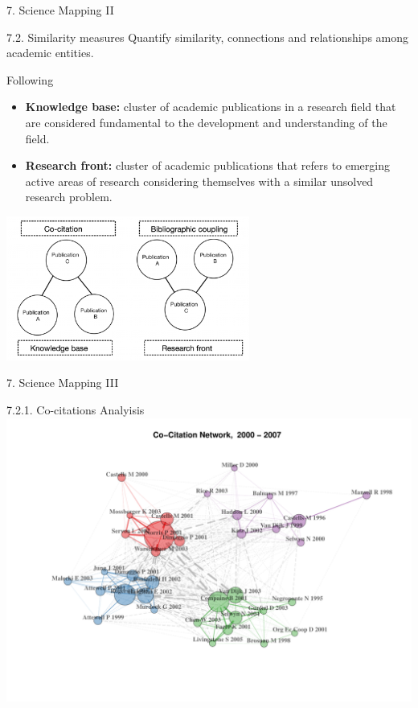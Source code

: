 \documentclass[
  ignorenonframetext,
]{beamer}
\begin{document}
\begin{frame}{7. Science Mapping II}
\protect\hypertarget{science-mapping-ii}{}
\begin{block}{7.2. Similarity measures}
\protect\hypertarget{similarity-measures}{}
Quantify similarity, connections and relationships among academic
entities.

Following \citet{kammerer2021}

\begin{itemize}
\item
  \textbf{Knowledge base:} cluster of academic publications in a
  research field that are considered fundamental to the development and
  understanding of the field.
\item
  \textbf{Research front:} cluster of academic publications that refers
  to emerging active areas of research considering themselves with a
  similar unsolved research problem.
\end{itemize}

\begin{center}
\includegraphics[width=0.6\textwidth]{pic_1.png}
\end{center}
\end{block}
\end{frame}

\begin{frame}{7. Science Mapping III}
\protect\hypertarget{science-mapping-iii}{}
\vspace{0.5cm}

\begin{block}{7.2.1. Co-citations Analyisis}
\protect\hypertarget{co-citations-analyisis}{}
\includegraphics{Presentation_bibliometric_files/figure-beamer/Co_cite_P1-1.pdf}
\end{block}
\end{frame}
\end{document}
